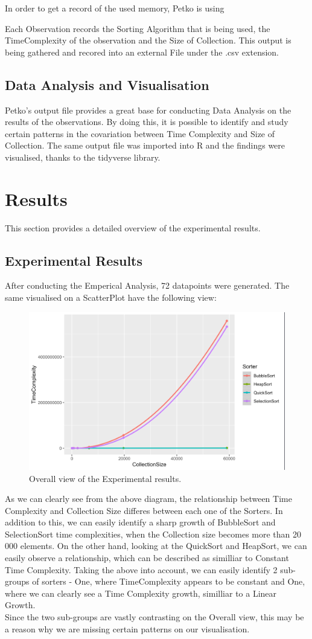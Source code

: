 \documentclass[]{report}
\begin{document}
In order to get a record of the used memory, Petko is using 

	\newpage
		 Each Observation records the Sorting Algorithm that is being used, the TimeComplexity of the observation and the Size of Collection. This output is being gathered and recored into an external File under the .csv extension. 
		\subsection{Data Analysis and Visualisation}
		Petko's output file provides a great base for conducting Data Analysis on the results of the observations. By doing this, it is possible to identify and study certain patterns in the covariation between Time Complexity and Size of Collection. The same output file was imported into R and the findings were visualised, thanks to the tidyverse library.
		\section{Results}
	This section provides a detailed overview of the experimental results.
\subsection{Experimental Results}
After conducting the Emperical Analysis, 72 datapoints were generated. The same visualised on a ScatterPlot have the following view:

\begin{figure}
	\centering
	\includegraphics[width=0.7\linewidth]{ResultsOverallView}
	\caption[Figure 3.1:]{Overall view of the Experimental results.}
	\label{fig:resultsoverallview}
\end{figure}
\newpage
As we can clearly see from the above diagram, the relationship between Time Complexity and Collection Size differes between each one of the Sorters. In addition to this, we can easily identify a sharp growth of BubbleSort and SelectionSort time complexities, when the Collection size becomes more than 20 000 elements. On the other hand, looking at the QuickSort and HeapSort, we can easily observe a relationship, which can be described as similliar to Constant Time Complexity.
Taking the above into account, we can easily identify 2 sub-groups of sorters - One, where  TimeComplexity appears to be constant and One, where we can clearly see a Time Complexity growth, similliar to a Linear Growth.\\
Since the two sub-groups are vastly contrasting on the Overall view, this may be a reason why we are missing certain patterns on our visualisation.
\end{document}

